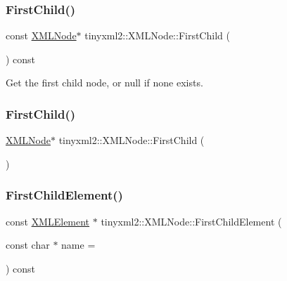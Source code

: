 \subsubsection{\texorpdfstring{First\+Child()}{FirstChild()}\hspace{0.1cm}{\footnotesize\ttfamily [1/2]}}
{\footnotesize\ttfamily const \mbox{\hyperlink{classtinyxml2_1_1_x_m_l_node}{X\+M\+L\+Node}}$\ast$ tinyxml2\+::\+X\+M\+L\+Node\+::\+First\+Child (\begin{DoxyParamCaption}{ }\end{DoxyParamCaption}) const\hspace{0.3cm}{\ttfamily [inline]}}



Get the first child node, or null if none exists. 

\mbox{\label{classtinyxml2_1_1_x_m_l_node_a2d6c70c475146b48bc93a7fafdeff5e0}} 
\subsubsection{\texorpdfstring{First\+Child()}{FirstChild()}\hspace{0.1cm}{\footnotesize\ttfamily [2/2]}}
{\footnotesize\ttfamily \mbox{\hyperlink{classtinyxml2_1_1_x_m_l_node}{X\+M\+L\+Node}}$\ast$ tinyxml2\+::\+X\+M\+L\+Node\+::\+First\+Child (\begin{DoxyParamCaption}{ }\end{DoxyParamCaption})\hspace{0.3cm}{\ttfamily [inline]}}

\mbox{\label{classtinyxml2_1_1_x_m_l_node_a1bec132dcf085284e0a10755f2cf0d57}} 
\subsubsection{\texorpdfstring{First\+Child\+Element()}{FirstChildElement()}\hspace{0.1cm}{\footnotesize\ttfamily [1/2]}}
{\footnotesize\ttfamily const \mbox{\hyperlink{classtinyxml2_1_1_x_m_l_element}{X\+M\+L\+Element}} $\ast$ tinyxml2\+::\+X\+M\+L\+Node\+::\+First\+Child\+Element (\begin{DoxyParamCaption}\item[{const char $\ast$}]{name = {} }\end{DoxyParamCaption}) const}

